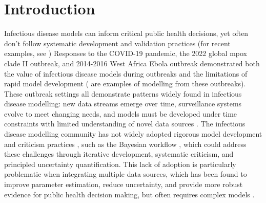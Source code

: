 \documentclass{article}
\begin{document}
\tableofcontents
\newpage

\section{Introduction}

Infectious disease models can inform critical public health decisions, yet often don't follow systematic development and validation practices (for recent examples, see \citep{Ward2024-sp, Fyles2024-qz, Abbott2021-delta, Abbott2022-prevalence})
Responses to the COVID-19 pandemic, the 2022 global mpox clade II outbreak, and 2014-2016 West Africa Ebola outbreak demonstrated both the value of infectious disease models during outbreaks and the limitations of rapid model development (\citep{knock2021key, ro2025estimating, Abbott2021-delta, Abbott2022-prevalence, Ward2024-sp, birrell2025real} are examples of modelling from these outbreaks).
These outbreak settings all demonstrate patterns widely found in infectious disease modelling: new data streams emerge over time, surveillance systems evolve to meet changing needs, and models must be developed under time constraints with limited understanding of novel data sources \citep{mccaw2023role}.
The infectious disease modelling community has not widely adopted rigorous model development and criticism practices \citep{box1979robustness}, such as the Bayesian workflow \citep{green2003highly,gelman2020bayesian, nicholson2022interoperability}, which could address these challenges through iterative development, systematic criticism, and principled uncertainty quantification.
This lack of adoption is particularly problematic when integrating multiple data sources, which has been found to improve parameter estimation, reduce uncertainty, and provide more robust evidence for public health decision making, but often requires complex models \citep{deangelis2018analysing, sherratt2021exploring}.
\end{document}
